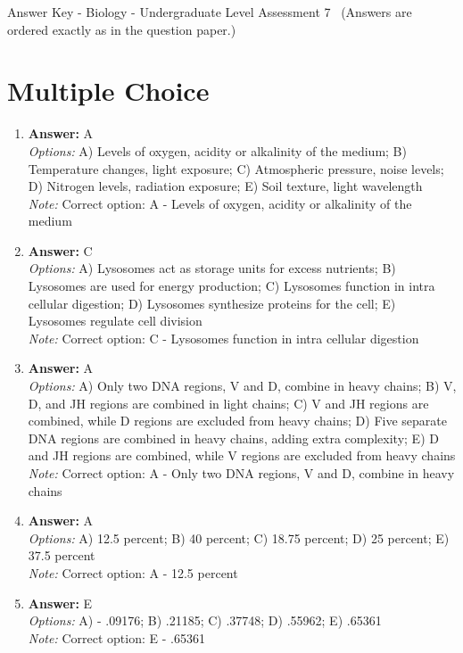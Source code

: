 \documentclass[12pt]{article}
\begin{document}
\begin{center}
Answer Key - Biology - Undergraduate Level Assessment 7 \
\small (Answers are ordered exactly as in the question paper.)
\end{center}

\section*{Multiple Choice}
\begin{enumerate}[label=\arabic*.]
\item \textbf{Answer:} A
\\ \textit{Options:} A) Levels of oxygen, acidity or alkalinity of the medium; B) Temperature changes, light exposure; C) Atmospheric pressure, noise levels; D) Nitrogen levels, radiation exposure; E) Soil texture, light wavelength
\\ \textit{Note:} Correct option: A - Levels of oxygen, acidity or alkalinity of the medium
\item \textbf{Answer:} C
\\ \textit{Options:} A) Lysosomes act as storage units for excess nutrients; B) Lysosomes are used for energy production; C) Lysosomes function in intra cellular digestion; D) Lysosomes synthesize proteins for the cell; E) Lysosomes regulate cell division
\\ \textit{Note:} Correct option: C - Lysosomes function in intra cellular digestion
\item \textbf{Answer:} A
\\ \textit{Options:} A) Only two DNA regions, V and D, combine in heavy chains; B) V, D, and JH regions are combined in light chains; C) V and JH regions are combined, while D regions are excluded from heavy chains; D) Five separate DNA regions are combined in heavy chains, adding extra complexity; E) D and JH regions are combined, while V regions are excluded from heavy chains
\\ \textit{Note:} Correct option: A - Only two DNA regions, V and D, combine in heavy chains
\item \textbf{Answer:} A
\\ \textit{Options:} A) 12.5 percent; B) 40 percent; C) 18.75 percent; D) 25 percent; E) 37.5 percent
\\ \textit{Note:} Correct option: A - 12.5 percent
\item \textbf{Answer:} E
\\ \textit{Options:} A) - .09176; B) .21185; C) .37748; D) .55962; E) .65361
\\ \textit{Note:} Correct option: E - .65361
\end{enumerate}
\end{document}
